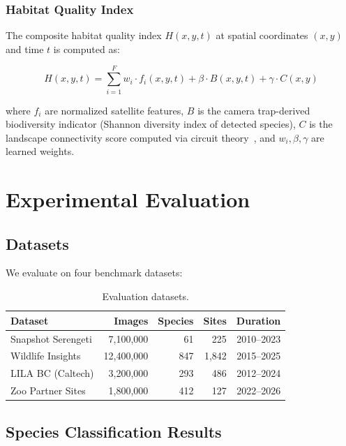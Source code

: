 \documentclass[11pt,letterpaper]{article}
\begin{document}
\subsubsection{Habitat Quality Index}

The composite habitat quality index $H(x, y, t)$ at spatial coordinates $(x, y)$ and time $t$ is computed as:

\begin{equation}
H(x, y, t) = \sum_{i=1}^{F} w_i \cdot f_i(x, y, t) + \beta \cdot B(x, y, t) + \gamma \cdot C(x, y)
\end{equation}

where $f_i$ are normalized satellite features, $B$ is the camera trap-derived biodiversity indicator (Shannon diversity index of detected species), $C$ is the landscape connectivity score computed via circuit theory~\cite{mcrae2008}, and $w_i, \beta, \gamma$ are learned weights.

\section{Experimental Evaluation}

\subsection{Datasets}

We evaluate on four benchmark datasets:

\begin{table}[htbp]
\centering
\caption{Evaluation datasets.}
\label{tab:datasets}
\begin{tabular}{lrrrr}
\toprule
\textbf{Dataset} & \textbf{Images} & \textbf{Species} & \textbf{Sites} & \textbf{Duration} \\
\midrule
Snapshot Serengeti & 7,100,000 & 61 & 225 & 2010--2023 \\
Wildlife Insights & 12,400,000 & 847 & 1,842 & 2015--2025 \\
LILA BC (Caltech) & 3,200,000 & 293 & 486 & 2012--2024 \\
Zoo Partner Sites & 1,800,000 & 412 & 127 & 2022--2026 \\
\bottomrule
\end{tabular}
\end{table}

\subsection{Species Classification Results}
\end{document}
